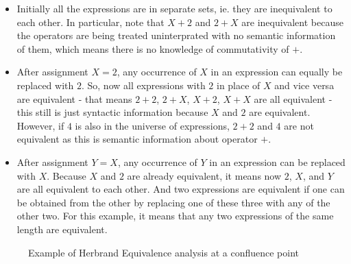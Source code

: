 \begin{itemize}
    \item   Initially all the expressions are in separate sets, ie. 
    they are inequivalent to each other. In particular, note that 
    $X + 2$ and $2 + X$ are inequivalent because the operators are 
    being treated uninterprated with no semantic information of them, 
    which means there is no knowledge of commutativity of $+$.
    \item   After assignment $X = 2$, any occurrence of $X$ in an
    expression can equally be replaced with $2$. So, now all expressions 
    with $2$ in place of $X$ and vice versa are equivalent - that means
    $2 + 2$, $2 + X$, $X + 2$, $X + X$ are all equivalent - this still 
    is just syntactic information because $X$ and $2$ are equivalent. 
    However, if $4$ is also in the universe of expressions, $2 + 2$ and 
    $4$ are not equivalent as this is semantic information about operator $+$.
    \item   After assignment $Y = X$, any occurrence of $Y$ in 
    an expression can be replaced with $X$. Because $X$ and $2$ are already 
    equivalent, it means now $2$, $X$, and $Y$ are all equivalent to 
    each other. And two expressions are equivalent if one can be 
    obtained from the other by replacing one of these three with any of the 
    other two. For this example, it means that any two expressions of 
    the same length are equivalent.
\end{itemize}

\begin{figure}[!ht]
    \caption{Example of Herbrand Equivalence analysis at a confluence point}
    \label{fig:HerbrandEquivalenceConv}
\end{figure}

